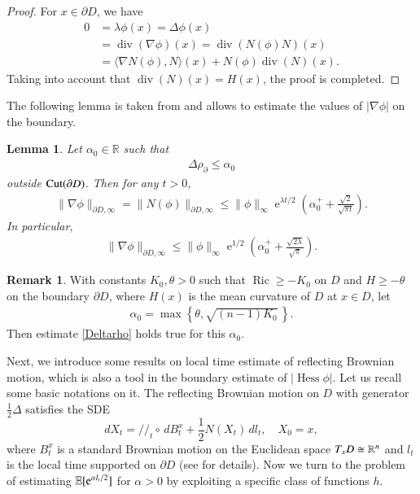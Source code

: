 \documentclass[11pt,reqno]{amsart}
\newtheorem{lemma}[theorem]{Lemma}
\theoremstyle{definition} \newtheorem{remark}[theorem]{Remark}
\numberwithin{equation}{section}
\def\Ric{{\operatorname{Ric}}} \def\Hess{\operatorname{Hess}}
\def\div{{\operatorname{div}}}
\newcommand\1{\mathbbm{1}}
\def\Ric{{\operatorname{Ric}}} \def\Aut{{\operatorname{Aut}}}
\def\r{\right}
\def\l{\left} \def\e{\operatorname{e}} \def\dsum{\displaystyle\sum}
\newcommand{\ptr}{/\!/}
\begin{document}
\begin{proof}
  For $x\in \partial D$, we have
  \begin{align*}
    0&=\lambda \phi(x)=\Delta \phi(x)\\
     &=\div (\nabla \phi)(x)=\div(N(\phi)N)(x)\\
     &=\langle \nabla N(\phi), N \rangle(x)+N(\phi)\div(N)(x).
  \end{align*}
  Taking into account that $\div(N)(x)=H(x)$, the proof is completed.
\end{proof}

The following lemma is taken from \cite[Proposition 2.5]{ATW} and
allows to estimate the values of $|\nabla \phi|$ on the boundary.

\begin{lemma}\label{lem1}
  Let $\alpha_0\in \mathbb{R}$ such that
  \begin{align}\label{Deltarho}
   \Delta\rho_{\partial }\leq \alpha_0
  \end{align}
  outside ${\rm Cut}(\partial D)$. 
  Then for any $t>0$,
  \begin{align*}
   \|\nabla \phi\|_{\partial D, \infty}
    =\|N(\phi)\|_{\partial D,\infty}\leq \|\phi\|_{\infty}\e^{\lambda
      t/2}\left(\alpha_0^++\frac{\sqrt{2}}{\sqrt{\pi t}}\right).
      \end{align*}
   In particular, 
   \begin{align}\label{esti-Nphi}
   \|\nabla \phi\|_{\partial D, \infty}
   \leq \|\phi\|_{\infty}\e^{1/2}\left(\alpha_0^++\frac{\sqrt{2\lambda}}{\sqrt{\pi }}\right).
      \end{align}
    \end{lemma}

\begin{remark}
   With constants $K_0,\theta>0$ such that $\Ric\geq -K_0$ on $D$ and
  $H\geq -\theta$ on the boundary $\partial D$, where $H(x)$ is the
  mean curvature of $D$ at $x\in D$, let
  \begin{align*}
    \alpha_0=\max\l\{\theta, \sqrt{(n-1)K_0}\,\r\}.
  \end{align*}
  Then estimate \eqref{Deltarho} holds true for this $\alpha_0$.
 \end{remark}

Next, we introduce some results on local time estimate of reflecting Brownian motion, which is also  a tool in the boundary estimate of $|\Hess \phi|$. Let us recall some basic notations on it.
The reflecting Brownian motion on $D$ with generator $\frac12\Delta$ satisfies the SDE
$$d X_t=\ptr_t\circ\,d B_t^x+\frac12N(X_t)\, d l_t,\quad X_0=x,$$
where $B_t^x$ is a standard Brownian motion on the Euclidean space $T_xD\cong \mathbb{R}^n$ and $l_t$ is
the local time supported on $\partial D$ (see \cite{Wbook2} for details).
Now we turn to the problem of estimating $\E[\e^{\alpha l_t/2}]$ for $\alpha>0$ by exploiting a specific class of functions $h$. 
\end{document}
